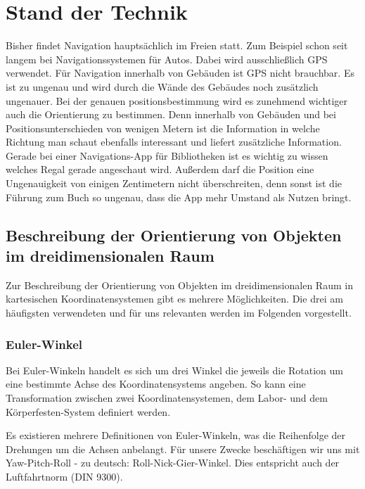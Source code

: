 
\chapter{Stand der Technik}
  \label{Stand der Technik}

\medskip
Bisher findet Navigation hauptsächlich im Freien statt. Zum Beispiel schon seit langem bei Navigationssystemen für Autos. Dabei wird ausschließlich GPS verwendet. Für Navigation innerhalb von Gebäuden ist GPS nicht brauchbar. Es ist zu ungenau und wird durch die Wände des Gebäudes noch zusätzlich ungenauer. Bei der genauen positionsbestimmung wird es zunehmend wichtiger auch die Orientierung zu bestimmen. Denn innerhalb von Gebäuden und bei Positionsunterschieden von wenigen Metern ist die Information in welche Richtung man schaut ebenfalls interessant und liefert zusätzliche Information. Gerade bei einer Navigations-App für Bibliotheken ist es wichtig zu wissen welches Regal gerade angeschaut wird. Außerdem darf die Position eine Ungenauigkeit von einigen Zentimetern nicht überschreiten, denn sonst ist die Führung zum Buch so ungenau, dass die App mehr Umstand als Nutzen bringt.

\section{Beschreibung der Orientierung von Objekten im dreidimensionalen Raum}
Zur Beschreibung der Orientierung von Objekten im dreidimensionalen Raum in kartesischen Koordinatensystemen gibt es mehrere Möglichkeiten. Die drei am häufigsten verwendeten und für uns relevanten werden im Folgenden vorgestellt.

\subsection{Euler-Winkel}
Bei Euler-Winkeln handelt es sich um drei Winkel die jeweils die Rotation um eine bestimmte Achse des Koordinatensystems angeben. So kann eine Transformation zwischen zwei Koordinatensystemen, dem Labor- und dem Körperfesten-System definiert werden.

Es existieren mehrere Definitionen von Euler-Winkeln, was die Reihenfolge der Drehungen um die Achsen anbelangt. Für unsere Zwecke beschäftigen wir uns mit Yaw-Pitch-Roll - zu deutsch: Roll-Nick-Gier-Winkel. Dies entspricht auch der Luftfahrtnorm (DIN 9300).


